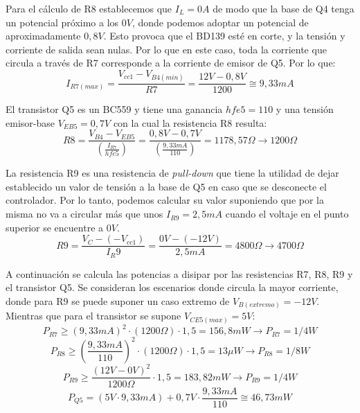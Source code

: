 Para el cálculo de R8 establecemos que $I_L=0A$ de modo que la base de Q4 tenga un potencial próximo a los $0V$, donde podemos adoptar un potencial de aproximadamente $0,8V$. Esto provoca que el BD139 esté en corte, y la tensión y corriente de salida sean nulas. Por lo que en este caso, toda la corriente que circula a través de R7 corresponde a la corriente de emisor de Q5. Por lo que:
\begin{equation}
I_{R7(max)}=\frac{V_{cc1}-V_{B4(min)}}{R7}=\frac{12V-0,8V}{1200}\cong 9,33 mA
\end{equation} \par 
El transistor Q5 es un BC559 y tiene una ganancia $hfe5=110$ y una tensión emisor-base $V_{EB5}=0,7V$ con la cual la resistencia R8 resulta:
\begin{equation}
R8=\frac{V_{B4}-V_{EB5}}{(\frac{I_{R7}}{hfe5})}=\frac{0,8V-0,7V}{(\frac{9,33 mA}{110})}=1178,57\Omega \to 1200\Omega
\end{equation}\par 

La resistencia R9 es una resistencia de \textit{pull-down} que tiene la utilidad de dejar establecido un valor de tensión a la base de Q5 en caso que se desconecte el controlador. Por lo tanto, podemos calcular su valor suponiendo que por la misma no va a circular más que unos $I_{R9}=2,5 mA$ cuando el voltaje en el punto superior se encuentre a $0V$.
\begin{equation}
R9=\frac{V_C-(-V_{cc1})}{I_R9}=\frac{0V-(-12V)}{2,5 mA}=4800\Omega \to 4700\Omega 
\end{equation}\par 

A continuación se calcula las potencias a disipar por las resistencias R7, R8, R9 y el transistor Q5. Se consideran los escenarios donde circula la mayor corriente, donde para R9 se puede suponer un caso extremo de $V_{B(extremo)}=-12V$. Mientras que para el transistor se supone $V_{CE5(max)}=5V$:
\begin{equation}
P_{R7}\geq (9,33mA)^2\cdot (1200\Omega )\cdot 1,5=156,8 mW	\to P_{R7}=1/4W
\end{equation}
\begin{equation}
P_{R8}\geq (\frac{9,33mA}{110})^2\cdot (1200\Omega )\cdot 1,5= 13\mu W \to P_{R8}=1/8W
\end{equation}
\begin{equation}
P_{R9}\geq \frac{(12V-0V)^2}{1200\Omega}\cdot 1,5=183,82 mW	\to 	P_{R9}=1/4W
\end{equation}
\begin{equation}
P_{Q5}=(5V\cdot 9,33mA)+0,7V\cdot \frac{9,33mA}{110}\cong 46,73mW
\end{equation}\par 

